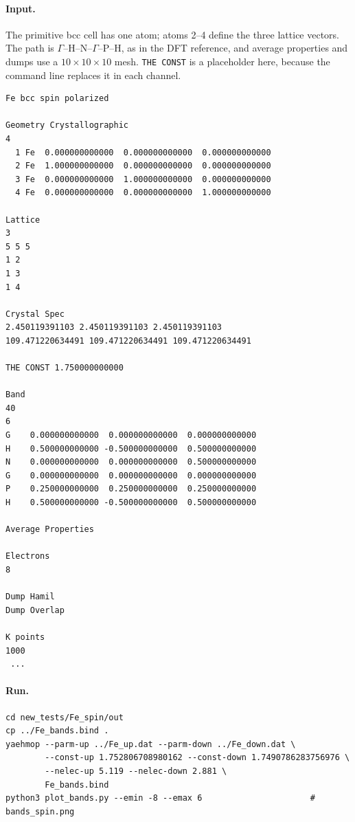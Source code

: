 \documentclass[11pt,a4paper]{article}
\newcommand{\file}[1]{\texttt{#1}}
\begin{document}
\paragraph{Input.} The primitive bcc cell has one atom; atoms 2--4 define the three
lattice vectors. The path is $\Gamma$--H--N--$\Gamma$--P--H, as in the DFT reference, and
average properties and dumps use a $10\times10\times10$ mesh. \texttt{THE CONST} is a
placeholder here, because the command line replaces it in each channel.
\begin{lstlisting}[style=sh,caption={\file{new\_tests/Fe\_spin/Fe\_bands.bind} (the 1000 mesh points are cut)}]
Fe bcc spin polarized

Geometry Crystallographic
4
  1 Fe  0.000000000000  0.000000000000  0.000000000000
  2 Fe  1.000000000000  0.000000000000  0.000000000000
  3 Fe  0.000000000000  1.000000000000  0.000000000000
  4 Fe  0.000000000000  0.000000000000  1.000000000000

Lattice
3
5 5 5
1 2
1 3
1 4

Crystal Spec
2.450119391103 2.450119391103 2.450119391103
109.471220634491 109.471220634491 109.471220634491

THE CONST 1.750000000000

Band
40
6
G    0.000000000000  0.000000000000  0.000000000000
H    0.500000000000 -0.500000000000  0.500000000000
N    0.000000000000  0.000000000000  0.500000000000
G    0.000000000000  0.000000000000  0.000000000000
P    0.250000000000  0.250000000000  0.250000000000
H    0.500000000000 -0.500000000000  0.500000000000

Average Properties

Electrons
8

Dump Hamil
Dump Overlap

K points
1000
 ...
\end{lstlisting}

\paragraph{Run.}
\begin{lstlisting}[style=sh]
cd new_tests/Fe_spin/out
cp ../Fe_bands.bind .
yaehmop --parm-up ../Fe_up.dat --parm-down ../Fe_down.dat \
        --const-up 1.752806708980162 --const-down 1.7490786283756976 \
        --nelec-up 5.119 --nelec-down 2.881 \
        Fe_bands.bind
python3 plot_bands.py --emin -8 --emax 6                      # bands_spin.png
\end{lstlisting}
\end{document}
